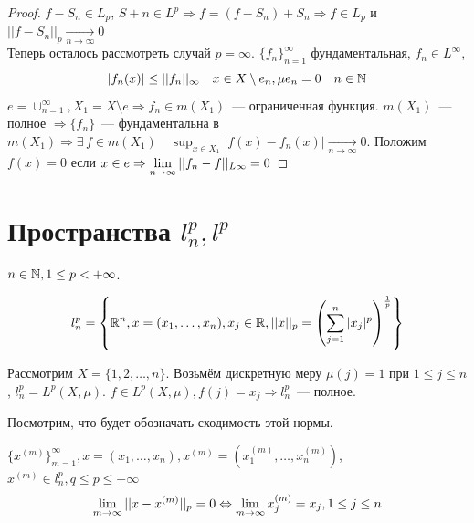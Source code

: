 \documentclass[document]{subfiles}
\begin{document}
\begin{proof}
    $f - S_n \in L_p$, $S+n \in L^p \Rightarrow f = (f - S_n) + S_n \Rightarrow f \in L_p$ и $ ||f - S_n||_p \underset{n \to \infty}{\longrightarrow} 0$ \\
    Теперь осталось рассмотреть случай $p = \infty$. $\{ f_n \}^\infty_{n=1}$ фундаментальная, $f_n \in L^\infty$, 
    \[ |f_n(x)| \leq ||f_n||_\infty \quad x \in X \setminus e_n, \mu e_n = 0 \quad n \in \mathbb{N} \]
    $ e = \cup^\infty_{n=1}, X_1 = X \setminus e \Rightarrow f_n \in m(X_1)$~--- ограниченная функция. $m(X_1)$~--- полное $\Rightarrow \{f_n\}$~--- фундаментальна в 
    $m(X_1) \Rightarrow \exists \, f \in m(X_1) \quad \sup_{x \in X_1} |f(x) - f_n(x)| \underset{n \to \infty}{\longrightarrow} 0$. Положим
    $f(x) = 0$ если $x \in e \Rightarrow \lim\limits_{n \to \infty} ||f_n - f||_{L\infty} = 0 $
 \end{proof}

 \section{Пространства $l_n^p, l^p$}

 $n \in \mathbb{N}, 1 \leq p < +\infty$.
 \begin{definition}
    \[ l^p_n = \left\{ \mathbb{R}^n, x = (x_1, \ldots, x_n), x_j \in \mathbb{R}, ||x||_p = \left( \sum^n_{j=1} |x_j|^p\right)^{\frac{1}{p}} \right\} \]
 \end{definition}
Рассмотрим $X = \{ 1,2, \ldots, n\}$. Возьмём дискретную меру $\mu(j) = 1$ при $1 \leq j \leq n$, $l^p_n = L^p(X, \mu)$.
$f \in L^p(X, \mu), f(j) = x_j \Rightarrow l^p_n$~--- полное.

Посмотрим, что будет обозначать сходимость этой нормы.

\begin{theorem}
    $\{ x^{(m)} \}^\infty_{m=1}, x = (x_1, \ldots, x_n), x^{(m)} = (x_1^{(m)}, \ldots, x_n^{(m)})$, $x^{(m)} \in l^p_n, q \leq p \leq + \infty$
    \[ \lim\limits_{m \to \infty} ||x - x^{(m)}||_p = 0 \Leftrightarrow \lim\limits_{m \to \infty} x_j^{(m)} = x_j, 1 \leq j \leq n \]
\end{theorem}
\end{document}
